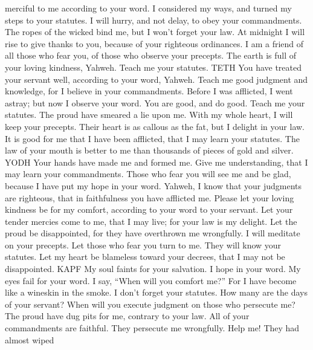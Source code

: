 merciful to me according to your word.  I considered my
ways, and turned my steps to your statutes.  I will
hurry, and not delay, to obey your commandments.  The
ropes of the wicked bind me, but I won't forget your law.
 At midnight I will rise to give thanks to you, because
of your righteous ordinances.  I am a friend of all those
who fear you, of those who observe your precepts.  The
earth is full of your loving kindness, Yahweh. Teach me your statutes.
TETH  You have treated your servant well, according to
your word, Yahweh.  Teach me good judgment and knowledge,
for I believe in your commandments.  Before I was
afflicted, I went astray; but now I observe your word. 
You are good, and do good. Teach me your statutes.  The
proud have smeared a lie upon me. With my whole heart, I will keep your
precepts.  Their heart is as callous as the fat, but I
delight in your law.  It is good for me that I have been
afflicted, that I may learn your statutes.  The law of
your mouth is better to me than thousands of pieces of gold and silver.
YODH  Your hands have made me and formed me. Give me
understanding, that I may learn your commandments.  Those
who fear you will see me and be glad, because I have put my hope in your
word.  Yahweh, I know that your judgments are righteous,
that in faithfulness you have afflicted me.  Please let
your loving kindness be for my comfort, according to your word to your
servant.  Let your tender mercies come to me, that I may
live; for your law is my delight.  Let the proud be
disappointed, for they have overthrown me wrongfully. I will meditate on
your precepts.  Let those who fear you turn to me. They
will know your statutes.  Let my heart be blameless
toward your decrees, that I may not be disappointed. KAPF
 My soul faints for your salvation. I hope in your word.
 My eyes fail for your word. I say, ``When will you
comfort me?''  For I have become like a wineskin in the
smoke. I don't forget your statutes.  How many are the
days of your servant? When will you execute judgment on those who
persecute me?  The proud have dug pits for me, contrary
to your law.  All of your commandments are faithful. They
persecute me wrongfully. Help me!  They had almost wiped
